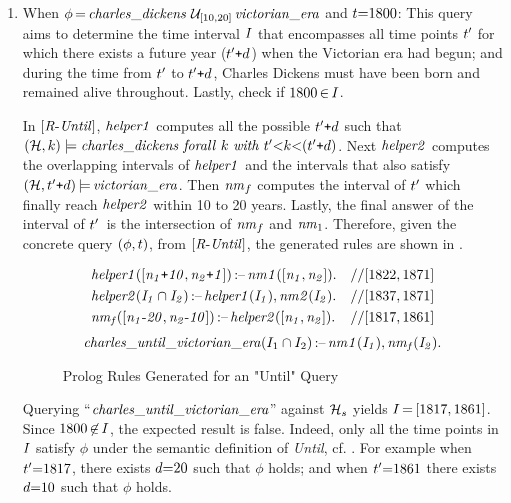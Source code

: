 \begin{enumerate}[itemsep=0.7em,leftmargin=!,wide]
\item When $\phi\,{=}\,\mathit{charles\_dickens}
~\mathcal{U}_{[10, 20]}\,\mathit{victorian\_era}$ and $t{=}1800$: This query aims to determine the time interval $I$ that encompasses all time points $t'$ for which there exists a future year ($t'\texttt{+}d$) when the Victorian era had begun; and during the time from $t'$ to $t'\texttt{+}d$, Charles Dickens must have been born and remained alive throughout. Lastly, check if $1800\,{\in}\,I$.

In $[\mathit{R}\text{-}\mathit{Until}]$, 
$\mathit{helper1}$ computes all the possible  $t'\texttt{+} d$  
such that $(\mathcal{H}, k)\models \mathit{charles\_dickens} ~\mathit{forall}~ 
k~\mathit{with} ~t'{<}k{<}(t'\texttt{+}d)$. 
Next $\mathit{helper2}$ computes the overlapping  intervals of $\mathit{helper1}$ and the intervals that also satisfy $(\mathcal{H}, t'\texttt{+}d)\,{\models}\,\mathit{victorian\_era}$. 
Then $\mathit{nm}_f$ computes the interval of $t'$ which finally reach $\mathit{helper2}$ within 10 to 20 years. 
Lastly, the final answer of the interval of $t'$~is the intersection of $\mathit{nm}_f$ and $\mathit{nm}_1$. 
Therefore, given the concrete query $(\phi, t)$, from $[\mathit{R}\text{-}\mathit{Until}]$, 
the generated rules are shown in . 




\begin{figure}[!h]
\vspace{-3mm}
{
\begin{align*}
&\mathit{helper1([n_1\texttt{+}10, n_2\texttt{+}1])}\,\text{:--}\, \mathit{\mathit{nm}1([n_1, n_2])}.
& // [1822, 1871]
\\
&\mathit{helper2(I_1\cap I_2)}\,\text{:--}\,\mathit{helper1(I_1)}, \mathit{\mathit{nm}2(I_2)}. 
& // [1837, 1871]
\\
& \mathit{\mathit{nm}_f([n_1\text{-}20, n_2\text{-}10])}\,\text{:--}\, \mathit{
helper2([n_1, n_2])}.
& // [1817, 1861]
\end{align*}
\vspace{-4mm}
\[\mathit{charles}\_\mathit{until}\_\mathit{victorian\_era}(I_1\cap I_2) \,\text{:--}\, \mathit{\mathit{nm}1(I_1)}, \mathit{\mathit{nm}_f(I_2)}.\]}
\caption{Prolog Rules Generated for an "Until" Query}
\label{fig:until10-20-encoding}
\vspace{-1mm}
\end{figure}

Querying ``$\mathit{charles}\_\mathit{until}\_\mathit{victorian\_era}$'' against $\mathcal{H}_s$ yields $I\,{=}\,[1817, 1861]$. Since $1800\,{\not\in}\,I$, the expected result is false. 
Indeed, only all the time points in $I$ satisfy $\phi$ under the semantic definition of \emph{Until}, cf.  . For example when $t'{=}1817$, there exists $d{=}20$ such that $\phi$ holds; and when $t'{=}1861$ there exists $d{=}10$ such that $\phi$ holds. 


\end{enumerate}

